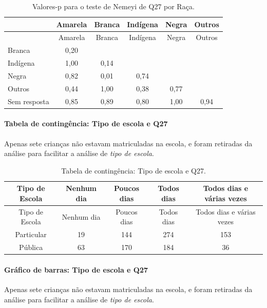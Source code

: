 \documentclass[]{article}
\let\oldparagraph\paragraph
\renewcommand{\paragraph}[1]{\oldparagraph{#1}\mbox{}}
\begin{document}
\begin{longtable}[]{@{}lccccc@{}}
\caption{\label{tab:unnamed-chunk-818}Valores-p para o teste de Nemeyi de Q27 por Raça.}\tabularnewline
\toprule
& Amarela & Branca & Indígena & Negra & Outros\tabularnewline
\midrule
\endfirsthead
\toprule
& Amarela & Branca & Indígena & Negra & Outros\tabularnewline
\midrule
\endhead
Branca & 0,20 & & & &\tabularnewline
Indígena & 1,00 & 0,14 & & &\tabularnewline
Negra & 0,82 & 0,01 & 0,74 & &\tabularnewline
Outros & 0,44 & 1,00 & 0,38 & 0,77 &\tabularnewline
Sem resposta & 0,85 & 0,89 & 0,80 & 1,00 & 0,94\tabularnewline
\bottomrule
\end{longtable}

\cleardoublepage

\hypertarget{tabela-de-continguxeancia-tipo-de-escola-e-q27}{%
\paragraph{Tabela de contingência: Tipo de escola e Q27}\label{tabela-de-continguxeancia-tipo-de-escola-e-q27}}

Apenas sete crianças não estavam matriculadas na escola, e foram retiradas da análise para facilitar a análise de \emph{tipo de escola}.

\begin{longtable}[]{@{}ccccc@{}}
\caption{\label{tab:unnamed-chunk-819}Tabela de contingência: Tipo de escola e Q27.}\tabularnewline
\toprule
Tipo de Escola & Nenhum dia & Poucos dias & Todos dias & Todos dias e várias vezes\tabularnewline
\midrule
\endfirsthead
\toprule
Tipo de Escola & Nenhum dia & Poucos dias & Todos dias & Todos dias e várias vezes\tabularnewline
\midrule
\endhead
Particular & 19 & 144 & 274 & 153\tabularnewline
Pública & 63 & 170 & 184 & 36\tabularnewline
\bottomrule
\end{longtable}

\hypertarget{gruxe1fico-de-barras-tipo-de-escola-e-q27}{%
\paragraph{Gráfico de barras: Tipo de escola e Q27}\label{gruxe1fico-de-barras-tipo-de-escola-e-q27}}

Apenas sete crianças não estavam matriculadas na escola, e foram retiradas da análise para facilitar a análise de \emph{tipo de escola}.
\end{document}
